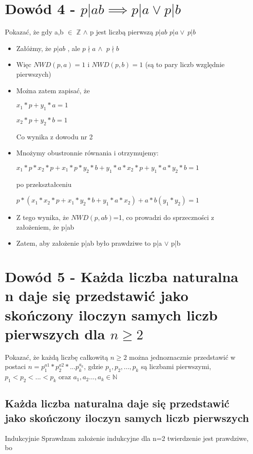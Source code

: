 \documentclass[a4paper, 12pt]{article}
\begin{document}
\section{Dowód 4 - \( p|ab\implies p|a \vee p|b \)}
Pokazać, że gdy a,b \( \in \) \(\mathbb{Z}\)
\( \wedge \) p jest liczbą pierwszą \( p|ab \) \implies \( p|a \vee\ p|b \)
\bigbreak
\begin{itemize}
	\item Załóżmy, że \( p|ab \) , ale \(p \nmid a\) \(\wedge\ \) \(p \nmid b\)
	\item Więc \(NWD(p,a)=1\) i \(NWD(p,b)=1 \) (są to pary liczb względnie pierwszych)
	\item Można zatem zapisać, że 
	
	\( x_{1}*p+ y_{1}*a=1 \)
	
	 \( x_{2}*p+y_{2}*b=1 \)
	 
	 Co wynika z dowodu nr 2
	 \item Mnożymy obustronnie równania i otrzymujemy:
	 
	 \(x_{1}*p*x_{2}*p+x_{1}*p*y_{2}*b+y_{1}*a*x_{2}*p+y_{1}*a*y_{2}*b=1 \)
	 
	 po przekształceniu
	
	 \( p*(x_{1}*x_{2}*p+x_{1}*y_{2}*b+y_{1}*a*x_{2})+ a*b(y_{1}*y_{2})=1\)
	 \item Z tego wynika, że \(NWD(p,ab) \)=1, co prowadzi do sprzeczności z założeniem, że p|ab
	 \item Zatem, aby założenie p|ab było prawdziwe to p|a \(\vee \) p|b 
\end{itemize}
\newpage
\section{ Dowód 5 - Każda liczba naturalna n daje się przedstawić jako skończony iloczyn samych liczb pierwszych dla \(n \geq 2 \) }

Pokazać, że każdą liczbę całkowitą \(n \geq 2\) można jednoznacznie przedstawić w postaci \(n= p_{1}^{a1}*p_{2}^{a2}*...p_{k}^{a_{k}}\), gdzie \(p_{1},p_{2},...,p_{k}\) są liczbami pierwszymi, \(p_{1}<p_{2}<...<p_{k}\) oraz \(a_{1},a_{2}...,a_{k} \in \mathbb{N}\)
\bigbreak
\subsection{ Każda liczba naturalna daje się przedstawić jako skończony iloczyn samych liczb pierwszych}
\bigbreak
Indukcyjnie 
\bigbreak
Sprawdzam założenie indukcyjne dla n=2 twierdzenie jest prawdziwe, bo 
\end{document}
